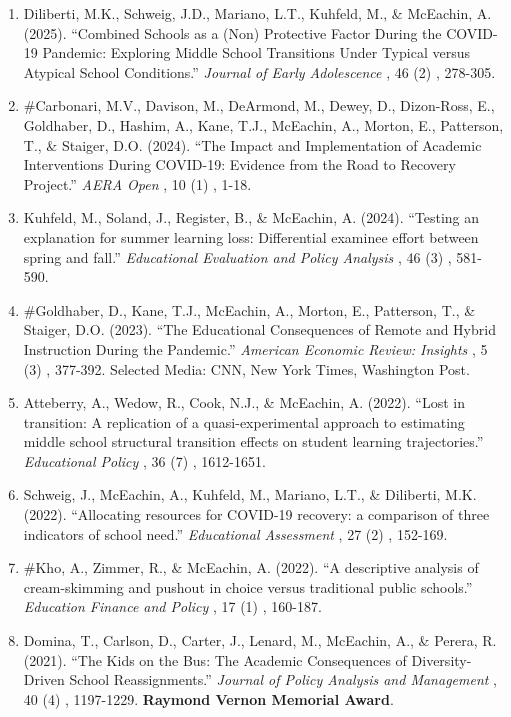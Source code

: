 \documentclass[11pt, letterpaper]{article}
\newcommand*{\revtotal}{0}
\newcommand*{\revarabic}[1]{\number\numexpr\revtotal + 1 - \value{#1}\relax}
\begin{document}
\begin{enumerate}[leftmargin=2em, label=\revarabic*.]
  \item Diliberti, M.K., Schweig, J.D., Mariano, L.T., Kuhfeld, M., \& McEachin, A. (2025).
  ``Combined Schools as a (Non) Protective Factor During the COVID-19 Pandemic: Exploring Middle School Transitions Under Typical versus Atypical School Conditions.''
  \textit{Journal of Early Adolescence}%
, 46%
(2)%
, 278-305.

  \item \#Carbonari, M.V., Davison, M., DeArmond, M., Dewey, D., Dizon-Ross, E., Goldhaber, D., Hashim, A., Kane, T.J., McEachin, A., Morton, E., Patterson, T., \& Staiger, D.O. (2024).
  ``The Impact and Implementation of Academic Interventions During COVID-19: Evidence from the Road to Recovery Project.''
  \textit{AERA Open}%
, 10%
(1)%
, 1-18.

  \item Kuhfeld, M., Soland, J., Register, B., \& McEachin, A. (2024).
  ``Testing an explanation for summer learning loss: Differential examinee effort between spring and fall.''
  \textit{Educational Evaluation and Policy Analysis}%
, 46%
(3)%
, 581-590.

  \item \#Goldhaber, D., Kane, T.J., McEachin, A., Morton, E., Patterson, T., \& Staiger, D.O. (2023).
  ``The Educational Consequences of Remote and Hybrid Instruction During the Pandemic.''
  \textit{American Economic Review: Insights}%
, 5%
(3)%
, 377-392.
  Selected Media: CNN, New York Times, Washington Post.

  \item Atteberry, A., Wedow, R., Cook, N.J., \& McEachin, A. (2022).
  ``Lost in transition: A replication of a quasi-experimental approach to estimating middle school structural transition effects on student learning trajectories.''
  \textit{Educational Policy}%
, 36%
(7)%
, 1612-1651.

  \item Schweig, J., McEachin, A., Kuhfeld, M., Mariano, L.T., \& Diliberti, M.K. (2022).
  ``Allocating resources for COVID-19 recovery: a comparison of three indicators of school need.''
  \textit{Educational Assessment}%
, 27%
(2)%
, 152-169.

  \item \#Kho, A., Zimmer, R., \& McEachin, A. (2022).
  ``A descriptive analysis of cream-skimming and pushout in choice versus traditional public schools.''
  \textit{Education Finance and Policy}%
, 17%
(1)%
, 160-187.

  \item Domina, T., Carlson, D., Carter, J., Lenard, M., McEachin, A., \& Perera, R. (2021).
  ``The Kids on the Bus: The Academic Consequences of Diversity-Driven School Reassignments.''
  \textit{Journal of Policy Analysis and Management}%
, 40%
(4)%
, 1197-1229.
  \textbf{Raymond Vernon Memorial Award}.


\end{enumerate}
\end{document}
